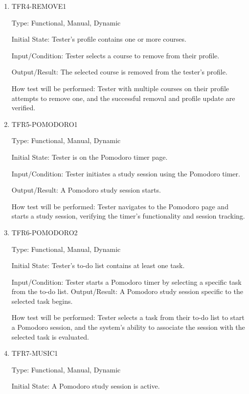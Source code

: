 \documentclass[12pt, titlepage]{article}
\begin{document}
\begin{enumerate}
\item{TFR4-REMOVE1\\}\label{TFR4-REMOVE1}

Type: Functional, Manual, Dynamic

Initial State: Tester's profile contains one or more courses.

Input/Condition: Tester selects a course to remove from their profile.

Output/Result: The selected course is removed from the tester's profile.

How test will be performed: Tester with multiple courses on their profile attempts to remove one, and the successful removal and profile update are verified.

\item{TFR5-POMODORO1\\}\label{TFR5-POMODORO1}

Type: Functional, Manual, Dynamic

Initial State: Tester is on the Pomodoro timer page.

Input/Condition: Tester initiates a study session using the Pomodoro timer.

Output/Result: A Pomodoro study session starts.

How test will be performed: Tester navigates to the Pomodoro page and starts a study session, verifying the timer's functionality and session tracking.

\item{TFR6-POMODORO2\\}\label{TFR6-POMODORO2}

Type: Functional, Manual, Dynamic

Initial State: Tester's to-do list contains at least one task.

Input/Condition: Tester starts a Pomodoro timer by selecting a specific task from the to-do list.
Output/Result: A Pomodoro study session specific to the selected task begins.

How test will be performed: Tester selects a task from their to-do list to start a Pomodoro session, and the system's ability to associate the session with the selected task is evaluated.

\item{TFR7-MUSIC1\\}\label{TFR7-MUSIC1}

Type: Functional, Manual, Dynamic

Initial State: A Pomodoro study session is active.


\end{enumerate}
\end{document}

